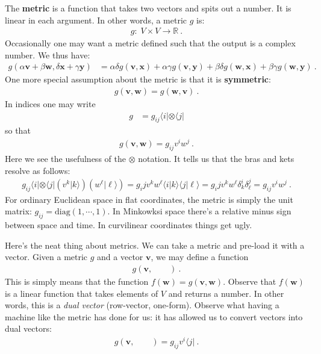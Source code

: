 \documentclass[12pt]{article}
\numberwithin{equation}{section}    %
\renewcommand{\vec}[1]{\mathbf{#1}} %
\begin{document}
The \textbf{metric} is a function that takes two vectors and spits out a number. It is linear in each argument. In other words, a metric $g$ is:
\begin{align}
  g:\; V\times V\to \mathbb{R} \ .
\end{align}
Occasionally one may want a metric defined such that the output is a complex number. We thus have:
\begin{align}
  g(\alpha \vec{v} + \beta\vec{w}, \delta \vec{x} + \gamma \vec{y})
  &= 
  \alpha \delta g(\vec{v},\vec{x}) + \alpha \gamma g(\vec{v},\vec{y}) + \beta\delta g(\vec{w},\vec{x}) + \beta\gamma g(\vec{w},\vec{y}) \ .
\end{align}
One more special assumption about the metric is that it is \textbf{symmetric}:
\begin{align}
  g(\vec{v},\vec{w}) = g(\vec{w}, \vec{v}) \ .
\end{align}
In indices one may write
\begin{align}
  g &= g_{ij} \langle i | \otimes \langle j |
\end{align}
so that
\begin{align}
  g(\vec{v}, \vec{w}) = g_{ij} v^{i}w^j \ .
 \end{align}
 Here we see the usefulness of the $\otimes$ notation. It tells us that the bras and kets resolve as follows:
 \begin{align}
   g_{ij}\langle i | \otimes \langle j | \left(v^k|k\rangle\right)\left(w^\ell|\ell\rangle\right) 
   = 
   g_ij v^k w^\ell 
   \langle i | k\rangle \langle j |\ell\rangle
   = 
   g_ij v^k w^\ell  \delta^i_k \delta^j_\ell 
   = 
   g_{ij} v^{i}w^j \ .
 \end{align}
 For ordinary Euclidean space in flat coordinates, the metric is simply the unit matrix: $g_{ij} = \text{diag}(1,\cdots, 1)$. In Minkowksi space there’s a relative minus sign between space and time. In curvilinear coordinates things get ugly. 
 
Here’s the neat thing about metrics. We can take a metric and pre-load it with a vector. Given a metric $g$ and a vector $\vec{v}$, we may define a function
\begin{align}
  g(\vec v,\qquad ) \ .
\end{align}
This is simply means that the function $f(\vec{w}) = g(\vec v,\vec w)$. Observe that $f(\vec{w})$ is a linear function that takes elements of $V$ and returns a number. In other words, this is a \emph{dual vector} (row-vector, one-form). Observe what having a machine like the metric has done for us: it has allowed us to convert vectors into dual vectors:
\begin{align}
  g(\vec v,\qquad )  = g_{ij} v^i \langle j| \ .
\end{align}
\end{document}
